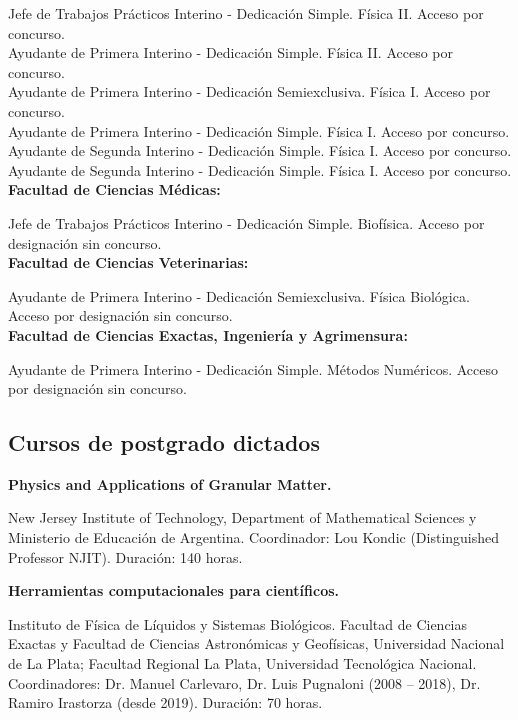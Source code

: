  Jefe de Trabajos Prácticos Interino - Dedicación Simple. Física II. Acceso por concurso.\\
 Ayudante de Primera Interino - Dedicación Simple. Física II. Acceso por concurso. \\
 Ayudante de Primera Interino - Dedicación Semiexclusiva. Física I. Acceso por concurso. \\
 Ayudante de Primera Interino - Dedicación Simple. Física I. Acceso por concurso. \\
 Ayudante de Segunda Interino - Dedicación Simple. Física I. Acceso por concurso. \\
 Ayudante de Segunda Interino - Dedicación Simple. Física I. Acceso por concurso. \\

\textbf{Facultad de Ciencias Médicas:}

 Jefe de Trabajos Prácticos Interino - Dedicación Simple. Biofísica. Acceso por designación sin concurso. \\

\textbf{Facultad de Ciencias Veterinarias:}

 Ayudante de Primera Interino - Dedicación Semiexclusiva. Física Biológica. Acceso por designación sin concurso.\\

\textbf{Facultad de Ciencias Exactas, Ingeniería y Agrimensura:}

 Ayudante de Primera Interino - Dedicación Simple. Métodos Numéricos. Acceso por designación sin concurso.

\subsection{Cursos de postgrado dictados}

 \textbf{Physics and Applications of Granular Matter.}

New Jersey Institute of Technology, Department of Mathematical Sciences y Ministerio de Educación de Argentina. Coordinador: Lou Kondic (Distinguished Professor NJIT). Duración: 140 horas.

 \textbf{Herramientas computacionales para científicos.}

 Instituto de Física de Líquidos y Sistemas Biológicos. Facultad de Ciencias Exactas y Facultad de Ciencias Astronómicas y Geofísicas, Universidad Nacional de La Plata; Facultad Regional La Plata, Universidad Tecnológica Nacional. Coordinadores: Dr. Manuel Carlevaro, Dr. Luis Pugnaloni (2008 -- 2018), Dr. Ramiro Irastorza (desde 2019). Duración: 70 horas.

